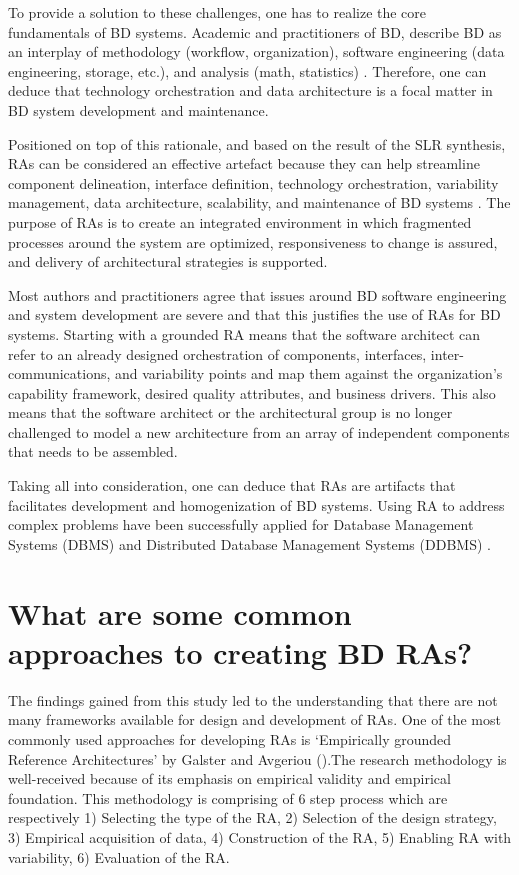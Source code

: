 \documentclass{ieeeaccess}
\begin{document}
To provide a solution to these challenges, one has to realize the core fundamentals of BD systems. Academic and practitioners of BD, describe BD as an interplay of methodology (workflow, organization), software engineering (data engineering, storage, etc.), and analysis (math, statistics) \cite{akhtar2019big}\cite{AtaeiBigDataEnvirons}. Therefore, one can deduce that technology orchestration and data architecture is a focal matter in BD system development and maintenance.

Positioned on top of this rationale, and based on the result of the SLR synthesis, RAs can be considered an effective artefact because they can help streamline component delineation, interface definition, technology orchestration, variability management, data architecture, scalability, and maintenance of BD systems \cite{Chang}\cite{Nadal}. The purpose of RAs is to create an integrated environment in which fragmented processes around the system are optimized, responsiveness to change is assured, and delivery of architectural strategies is supported. 

Most authors and practitioners agree that issues around BD software engineering and system development are severe and that this justifies the use of RAs for BD systems. Starting with a grounded RA means that the software architect can refer to an already designed orchestration of components, interfaces, inter-communications, and variability points and map them against the organization’s capability framework, desired quality attributes, and business drivers. This also means that the software architect or the architectural group is no longer challenged to model a new architecture from an array of independent components that needs to be assembled.

Taking all into consideration, one can deduce that RAs are artifacts that facilitates development and homogenization of BD systems. Using RA to address complex problems have been successfully applied for Database Management Systems (DBMS) \cite{pineiro2019big} and Distributed Database Management Systems (DDBMS) \cite{rahimi2010distributed}.

\section{What are some common approaches to creating BD RAs?}

The findings gained from this study led to the understanding that there are not many frameworks available for design and development of RAs. One of the most commonly used approaches for developing RAs is ‘Empirically grounded Reference Architectures’ by Galster and Avgeriou (\cite{galster2011empirically}).The research methodology is well-received because of its emphasis on empirical validity and empirical foundation. This methodology is comprising of 6 step process which are respectively 1) Selecting the type of the RA, 2) Selection of the design strategy, 3) Empirical acquisition of data, 4) Construction of the RA, 5) Enabling RA with variability, 6) Evaluation of the RA.
\end{document}
